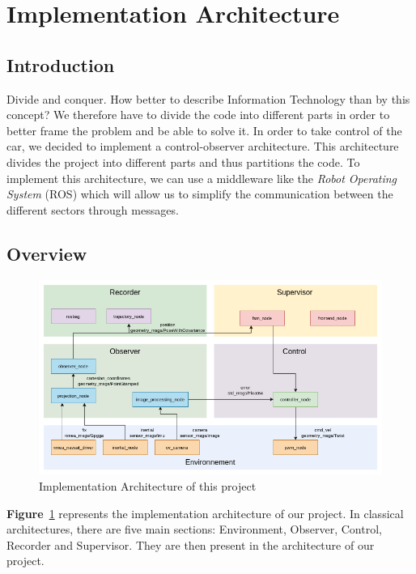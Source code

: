 \section{Implementation Architecture}

\subsection{Introduction}
Divide and conquer. How better to describe Information Technology than by this concept?
We therefore have to divide the code into different parts in order to better frame 
the problem and be able to solve it. In order to take control of the car, we decided 
to implement a control-observer architecture. This architecture divides the project 
into different parts and thus partitions the code. To implement this architecture, we
can use a middleware like the \textit{Robot Operating System} (ROS) which will allow us
to simplify the communication between the different sectors through messages.

\subsection{Overview} %

\begin{figure}[!ht]
    \begin{center}
        \includegraphics[scale=0.51]{Images/node_graph.png}
    \end{center}
    \caption{Implementation Architecture of this project}
    \label{fig:node_graph}
\end{figure}

\textbf{Figure}~\ref{fig:node_graph} represents the implementation architecture of our project.
In classical architectures, there are five main sections: Environment, 
Observer, Control, Recorder and Supervisor. They are then present in the architecture 
of our project. 

